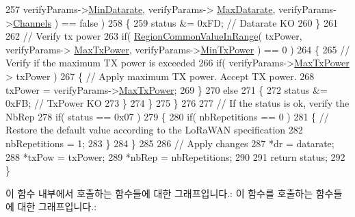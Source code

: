 \begin{DoxyCode}
257                                       verifyParams->\mbox{\hyperlink{structs_region_common_link_adr_req_verify_params_a990b009904bde32da9c6f4cd39a27e4c}{MinDatarate}}, verifyParams->
      \mbox{\hyperlink{structs_region_common_link_adr_req_verify_params_af426381985228a55dc22b90441f49c4c}{MaxDatarate}}, verifyParams->\mbox{\hyperlink{structs_region_common_link_adr_req_verify_params_afecbd1e457cbd79eb7072bd140ff33d4}{Channels}}  ) == \textcolor{keyword}{false} )
258         \{
259             status &= 0xFD; \textcolor{comment}{// Datarate KO}
260         \}
261 
262         \textcolor{comment}{// Verify tx power}
263         \textcolor{keywordflow}{if}( \mbox{\hyperlink{group___r_e_g_i_o_n_c_o_m_m_o_n_gafdd1c80d953e18d755a631b72a9c3bd3}{RegionCommonValueInRange}}( txPower, verifyParams->
      \mbox{\hyperlink{structs_region_common_link_adr_req_verify_params_a118829b26fb7d913d4202d5d06356a95}{MaxTxPower}}, verifyParams->\mbox{\hyperlink{structs_region_common_link_adr_req_verify_params_afe7bf10e9fadd8be6beb31e8b91a1ba2}{MinTxPower}} ) == 0 )
264         \{
265             \textcolor{comment}{// Verify if the maximum TX power is exceeded}
266             \textcolor{keywordflow}{if}( verifyParams->\mbox{\hyperlink{structs_region_common_link_adr_req_verify_params_a118829b26fb7d913d4202d5d06356a95}{MaxTxPower}} > txPower )
267             \{ \textcolor{comment}{// Apply maximum TX power. Accept TX power.}
268                 txPower = verifyParams->\mbox{\hyperlink{structs_region_common_link_adr_req_verify_params_a118829b26fb7d913d4202d5d06356a95}{MaxTxPower}};
269             \}
270             \textcolor{keywordflow}{else}
271             \{
272                 status &= 0xFB; \textcolor{comment}{// TxPower KO}
273             \}
274         \}
275     \}
276 
277     \textcolor{comment}{// If the status is ok, verify the NbRep}
278     \textcolor{keywordflow}{if}( status == 0x07 )
279     \{
280         \textcolor{keywordflow}{if}( nbRepetitions == 0 )
281         \{ \textcolor{comment}{// Restore the default value according to the LoRaWAN specification}
282             nbRepetitions = 1;
283         \}
284     \}
285 
286     \textcolor{comment}{// Apply changes}
287     *dr = datarate;
288     *txPow = txPower;
289     *nbRep = nbRepetitions;
290 
291     \textcolor{keywordflow}{return} status;
292 \}
\end{DoxyCode}
이 함수 내부에서 호출하는 함수들에 대한 그래프입니다.\+:
이 함수를 호출하는 함수들에 대한 그래프입니다.\+:
\mbox{\label{group___r_e_g_i_o_n_c_o_m_m_o_n_ga8403c78482dbb901014dba48b75d78e8}} 
